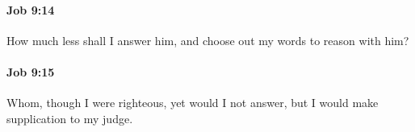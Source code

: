 		\paragraph{Job 9:14} %
			\label{JOB-9-14}

			How much less shall I answer him, and choose out my words to reason with him?


		\paragraph{Job 9:15} %
			\label{JOB-9-15}

			Whom, though I were righteous, yet would I not answer, but I would make supplication to my judge.


